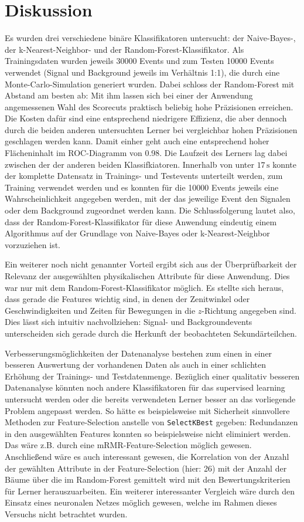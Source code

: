 \section{Diskussion}
\label{sec:Diskussion}

Es wurden drei verschiedene binäre Klassifikatoren untersucht: der Naive-Bayes-, der k-Nearest-Neighbor- und der Random-Forest-Klassifikator. Als Trainingsdaten wurden jeweils 30000 Events und zum Testen 10000 Events verwendet (Signal und Background jeweils im Verhältnis 1:1), die durch eine Monte-Carlo-Simulation generiert wurden. Dabei schloss der Random-Forest mit Abstand am besten ab: Mit ihm lassen sich bei einer der Anwendung angemessenen Wahl des Scorecuts praktisch beliebig hohe Präzisionen erreichen. Die Kosten dafür sind eine entsprechend niedrigere Effizienz, die aber dennoch durch die beiden anderen untersuchten Lerner bei vergleichbar hohen Präzisionen geschlagen werden kann. Damit einher geht auch eine entsprechend hoher Flächeninhalt im ROC-Diagramm von 0.98. Die Laufzeit des Lerners lag dabei zwischen der der anderen beiden Klassifkiatoren. Innerhalb von unter $17 \, \text{s}$ konnte der komplette Datensatz in Trainings- und  Testevents unterteilt werden, zum Training verwendet werden und es konnten für die 10000 Events jeweils eine Wahrscheinlichkeit angegeben werden, mit der das jeweilige Event den Signalen oder dem Background zugeordnet werden kann. Die Schlussfolgerung lautet also, dass der Random-Forest-Klassifikator für diese Anwendung eindeutig einem Algorithmus auf der Grundlage von Naive-Bayes oder k-Nearest-Neighbor vorzuziehen ist.

Ein weiterer noch nicht genannter Vorteil ergibt sich aus der Überprüfbarkeit der Relevanz der ausgewählten physikalischen Attribute für diese Anwendung. Dies war nur mit dem Random-Forest-Klassifikator möglich. Es stellte sich heraus, dass gerade die Features wichtig sind, in denen der Zenitwinkel oder Geschwindigkeiten und Zeiten für Bewegungen in die $z$-Richtung angegeben sind. Dies lässt sich intuitiv nachvollziehen: Signal- und Backgroundevents unterscheiden sich gerade durch die Herkunft der beobachteten Sekundärteilchen.

Verbesserungsmöglichkeiten der Datenanalyse bestehen zum einen in einer besseren Auswertung der vorhandenen Daten als auch in einer schlichten Erhöhung der Trainings- und Testdatenmenge. Bezüglich einer qualitativ besseren Datenanalyse könnten noch andere Klassifikatoren für das supervised learning untersucht werden oder die bereits verwendeten Lerner besser an das vorliegende Problem angepasst werden. So hätte es beispielsweise mit Sicherheit sinnvollere Methoden zur Feature-Selection anstelle von \texttt{SelectKBest} gegeben: Redundanzen in den ausgewählten Features konnten so beispielsweise nicht eliminiert werden. Das wäre z.B. durch eine mRMR-Feature-Selection möglich gewesen. Anschließend wäre es auch interessant gewesen, die Korrelation von der Anzahl der gewählten Attribute in der Feature-Selection (hier: 26) mit der Anzahl der Bäume über die im Random-Forest gemittelt wird mit den Bewertungskriterien für Lerner herauszuarbeiten. Ein weiterer interessanter Vergleich wäre durch den Einsatz eines neuronalen Netzes möglich gewesen, welche im Rahmen dieses Versuchs nicht betrachtet wurden.